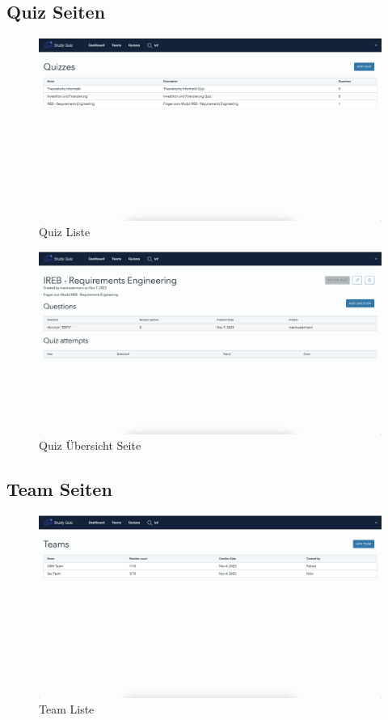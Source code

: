 \subsection*{Quiz Seiten}




\begin{figure}[H]
  \includegraphics[width=\linewidth]{img/quiz-list.png}
  \caption{Quiz Liste}
  \label{fig:quiz}
\end{figure}

\begin{figure}[H]
  \includegraphics[width=\linewidth]{img/quiz-detail.png}
  \caption{Quiz Übersicht Seite}
  \label{fig:quiz}
\end{figure}


\subsection*{Team Seiten}

\begin{figure}[H]
  \includegraphics[width=\linewidth]{img/team-list.png}
  \caption{Team Liste}
  \label{fig:team}
\end{figure}

